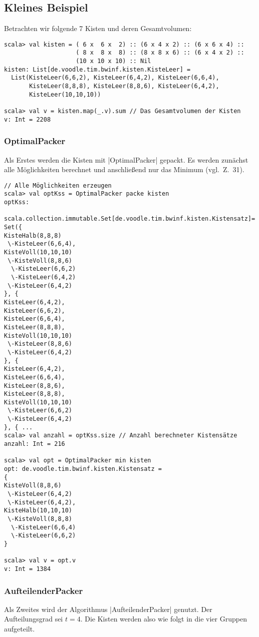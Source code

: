 \subsection{Kleines Beispiel}
Betrachten wir folgende 7 Kisten und deren Gesamtvolumen:
\begin{lstlisting}
scala> val kisten = ( 6 x  6 x  2) :: (6 x 4 x 2) :: (6 x 6 x 4) ::
                    ( 8 x  8 x  8) :: (8 x 8 x 6) :: (6 x 4 x 2) ::
                    (10 x 10 x 10) :: Nil
kisten: List[de.voodle.tim.bwinf.kisten.KisteLeer] =
  List(KisteLeer(6,6,2), KisteLeer(6,4,2), KisteLeer(6,6,4),
       KisteLeer(8,8,8), KisteLeer(8,8,6), KisteLeer(6,4,2),
       KisteLeer(10,10,10))

scala> val v = kisten.map(_.v).sum // Das Gesamtvolumen der Kisten
v: Int = 2208

\end{lstlisting}

\subsubsection*{OptimalPacker}
Als Erstes werden die Kisten mit |OptimalPacker| gepackt.
Es werden zunächst alle Möglichkeiten berechnet und anschließend nur das Minimum (vgl.\ Z.\ 31).

\begin{lstlisting}
// Alle Möglichkeiten erzeugen
scala> val optKss = OptimalPacker packe kisten
optKss:
 scala.collection.immutable.Set[de.voodle.tim.bwinf.kisten.Kistensatz]=
Set({
KisteHalb(8,8,8)
 \-KisteLeer(6,6,4),
KisteVoll(10,10,10)
 \-KisteVoll(8,8,6)
  \-KisteLeer(6,6,2)
  \-KisteLeer(6,4,2)
 \-KisteLeer(6,4,2)
}, {
KisteLeer(6,4,2),
KisteLeer(6,6,2),
KisteLeer(6,6,4),
KisteLeer(8,8,8),
KisteVoll(10,10,10)
 \-KisteLeer(8,8,6)
 \-KisteLeer(6,4,2)
}, {
KisteLeer(6,4,2),
KisteLeer(6,6,4),
KisteLeer(8,8,6),
KisteLeer(8,8,8),
KisteVoll(10,10,10)
 \-KisteLeer(6,6,2)
 \-KisteLeer(6,4,2)
}, { ...
scala> val anzahl = optKss.size // Anzahl berechneter Kistensätze
anzahl: Int = 216

scala> val opt = OptimalPacker min kisten
opt: de.voodle.tim.bwinf.kisten.Kistensatz = 
{
KisteVoll(8,8,6)
 \-KisteLeer(6,4,2)
 \-KisteLeer(6,4,2),
KisteHalb(10,10,10)
 \-KisteVoll(8,8,8)
  \-KisteLeer(6,6,4)
  \-KisteLeer(6,6,2)
}

scala> val v = opt.v
v: Int = 1384
\end{lstlisting}

\subsubsection*{AufteilenderPacker}
Als Zweites wird der Algorithmus |AufteilenderPacker| genutzt.
Der Aufteilungsgrad sei $t=4$.
Die Kisten werden also wie folgt in die vier Gruppen aufgeteilt.

